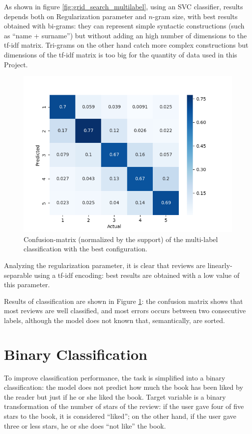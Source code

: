 \documentclass[fleqn,10pt]{SelfArx}
\begin{document}
As shown in figure \ref{fig:grid_search_multilabel}, using an SVC classifier, results depends both on Regularization parameter and $n$-gram size, with best results obtained with bi-grams: they can represent simple syntactic constructions (such as ``name + surname'') but without adding an high number of dimensions to the tf-idf matrix.
Tri-grams on the other hand catch more complex constructions but dimensions of the tf-idf matrix is too big for the quantity of data used in this Project.

\begin{figure}[!h]
  \center
  \includegraphics[width=0.9\linewidth]{confusionMatrix_prec.png}
  \caption{Confusion-matrix (normalized by the support) of the multi-label classification with the best configuration.}
  \label{fig:conf_matrix_multilabel}
\end{figure}

Analyzing the regularization parameter, it is clear that reviews are linearly-separable using a tf-idf encoding: best results are obtained with a low value of this parameter.

Results of classification are shown in Figure \ref{fig:conf_matrix_multilabel}: the confusion matrix shows that most reviews are well classified, and most errors occurs between two consecutive labels, although the model does not known that, semantically, are sorted.

\section{Binary Classification}
To improve classification performance, the task is simplified into a binary classification: the model does not predict how much the book has been liked by the reader but just if he or she liked the book.
Target variable is a binary transformation of the number of stars of the review: if the user gave four of five stars to the book, it is considered ``liked''; on the other hand, if the user gave three or less stars, he or she does ``not like'' the book.
\end{document}
